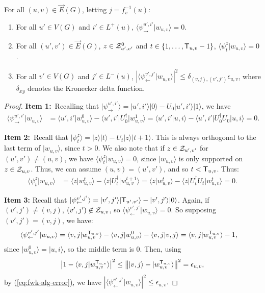 \documentclass{theoretics}
\newcommand{\eq}[1]{\hyperref[eq:#1]{(\ref*{eq:#1})}}
\def\ket#1{{\lvert}#1\rangle}
\def\bra#1{{\langle}#1\rvert}
\renewcommand{\>}{\rangle}
\newcommand{\<}{\langle}
\renewcommand{\(}{\left(}
\renewcommand{\)}{\right)}
\def\braket#1#2{{{\langle}#1\vert}#2\rangle}
\def\abs#1{\left| #1 \right|}
\def\norm#1{\left\| #1 \right\|}
\begin{document}
\begin{claim}\label{clm:ortho1}
For all $(u,v)\in \overrightarrow{E}(G)$, letting $j=f_v^{-1}(u)$:
\begin{enumerate}
\item For all $u'\in V(G)$ and $i'\in L^+(u)$, $\braket{\psi_{\rightarrow}^{u',i'}}{w_{u,v}}=0$.
\item For all $(u',v')\in \overrightarrow{E}(G)$, $z\in{\cal Z}_{u',v'}^0$ and $t\in \{1,\dots,{\sf T}_{u,v}-1\}$, $\braket{\psi_t^{z}}{w_{u,v}}=0$. 
\item For all $v'\in V(G)$ and $j'\in L^-(u)$, 
$|\braket{\psi_{\leftarrow}^{v',j'}}{w_{u,v}}|^2\leq
\delta_{(v,j),(v',j')}{\epsilon_{u,v}}$, where $\delta_{xy}$ denotes the Kronecker delta function.
\end{enumerate}
\end{claim}
\begin{proof}
\textbf{Item 1:}~Recalling that $\ket{\psi_{\rightarrow}^{u',i'}}=\ket{u',i'}\ket{0}-U_0\ket{u',i'}\ket{1}$, we have
\begin{align*}
\braket{\psi_{\rightarrow}^{u',i'}}{w_{u,v}} &= \braket{u',i'}{w_{u,v}^0} - \bra{u',i'}U_0^\dagger\ket{w_{u,v}^{1}}
= \braket{u',i'}{u,i} - \bra{u',i'}U_0^\dagger U_0\ket{u,i} = 0.
\end{align*}



\noindent\textbf{Item 2:}~Recall that $\ket{\psi_{t}^z}=\ket{z}\ket{t}-U_t\ket{z}\ket{t+1}$. This is always orthogonal to the last term of $\ket{w_{u,v}}$, since $t>0$. We also note that if $z\in {\cal Z}_{u',v'}$ for $(u',v')\neq (u,v)$, we have $\braket{\psi_t^z}{w_{u,v}}=0$, since $\ket{w_{u,v}}$ is only supported on $z\in{\cal Z}_{u,v}$. Thus, we can assume $(u,v)=(u',v')$, and so $t<{\sf T}_{u,v}$. Thus:
\begin{align*}
\braket{\psi_t^z}{w_{u,v}} &= \braket{z}{w_{u,v}^t} - \bra{z}U_t^\dagger\ket{w_{u,v}^{t+1}}
= \braket{z}{w_{u,v}^t} - \bra{z}U_t^\dagger U_t\ket{w_{u,v}^{t}} = 0.
\end{align*}

\noindent\textbf{Item 3:} Recall that $\ket{\psi_{\leftarrow}^{v',j'}}=\ket{v',j'}\ket{{\sf T}_{u',v'}}-\ket{v',j'}\ket{0}$. Again, if $(v',j')\neq (v,j)$, $(v',j')\not\in {\cal Z}_{u,v}$, so $\braket{\psi_{\leftarrow}^{v',j'}}{w_{u,v}}=0$. So supposing $(v',j')=(v,j)$, we have:
\begin{align*}
\braket{\psi_{\leftarrow}^{v',j'}}{w_{u,v}} &=  \braket{v,j}{w_{u,v}^{{\sf T}_{u,v}}}-\braket{v,j}{w_{u,v}^0}
-\braket{v,j}{v,j}
= \braket{v,j}{w_{u,v}^{{\sf T}_{u,v}}}-1,
\end{align*}
since $\ket{w_{u,v}^0}=\ket{u,i}$, so the middle term is 0. Then, using 
$$\abs{1-\braket{v,j}{w_{u,v}^{{\sf T}_{u,v}}}}^2\leq\norm{\ket{v,j}-\ket{w_{u,v}^{{\sf T}_{u,v}}}}^2= {\epsilon_{u,v}},$$
by \eq{fwk-alg-error}, 
we have
$|\braket{\psi_{\leftarrow}^{v',j'}}{w_{u,v}}|^2\leq {\epsilon_{u,v}}.$
\end{proof}
\end{document}
